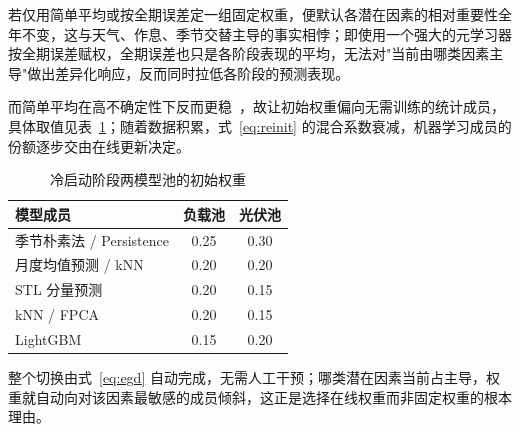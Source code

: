 若仅用简单平均或按全期误差定一组固定权重，便默认各潜在因素的相对重要性全年不变，这与天气、作息、季节交替主导的事实相悖；即使用一个强大的元学习器按全期误差赋权，全期误差也只是各阶段表现的平均，无法对"当前由哪类因素主导"做出差异化响应，反而同时拉低各阶段的预测表现。



而简单平均在高不确定性下反而更稳~\cite{graefe2015}，故让初始权重偏向无需训练的统计成员，具体取值见表~\ref{tab:coldstart}；随着数据积累，式~\eqref{eq:reinit} 的混合系数衰减，机器学习成员的份额逐步交由在线更新决定。

\begin{table}[htbp]
\centering
\caption{冷启动阶段两模型池的初始权重}
{\small
\begin{tabular}{lcc}
\toprule
模型成员 & 负载池 & 光伏池 \\
\midrule
季节朴素法 / Persistence & 0.25 & 0.30 \\
月度均值预测 / kNN       & 0.20 & 0.20 \\
STL 分量预测             & 0.20 & 0.15 \\
kNN / FPCA               & 0.20 & 0.15 \\
LightGBM                 & 0.15 & 0.20 \\
\bottomrule
\end{tabular}}
\label{tab:coldstart}
\end{table}





整个切换由式~\eqref{eq:egd} 自动完成，无需人工干预；哪类潜在因素当前占主导，权重就自动向对该因素最敏感的成员倾斜，这正是选择在线权重而非固定权重的根本理由。
